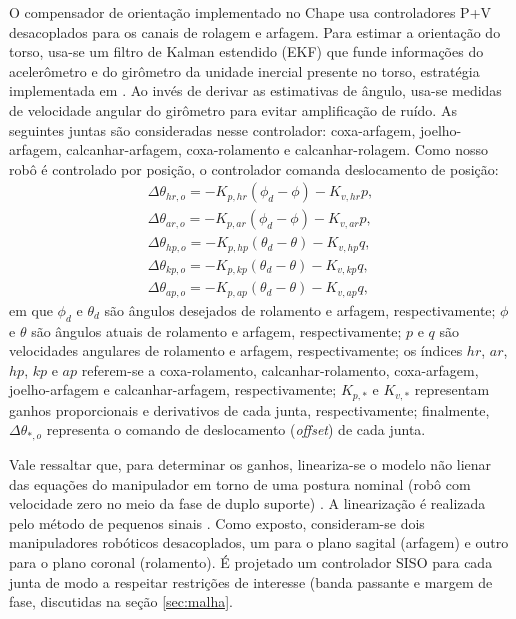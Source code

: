 O compensador de orientação implementado no Chape usa controladores P+V desacoplados para os canais de rolagem e arfagem. Para estimar a orientação do torso, usa-se um filtro de Kalman estendido (EKF) que funde informações do acelerômetro e do girômetro da unidade inercial presente no torso, estratégia implementada em \cite{tesemarcos}. Ao invés de derivar as estimativas de ângulo, usa-se medidas de velocidade angular do girômetro para evitar amplificação de ruído. As seguintes juntas são consideradas nesse controlador: coxa-arfagem, joelho-arfagem, calcanhar-arfagem, coxa-rolamento e calcanhar-rolagem. Como nosso robô é controlado por posição, o controlador comanda deslocamento de posição:
\begin{align}
\Delta \theta_{hr,o} = -K_{p,hr} \left( \phi_d - \phi \right) - K_{v,hr} p, \\
\Delta \theta_{ar,o} = -K_{p,ar} \left( \phi_d - \phi \right) - K_{v,ar} p, \\
\Delta \theta_{hp,o} = -K_{p,hp} \left( \theta_d - \theta \right) - K_{v,hp} q, \\
\Delta \theta_{kp,o} = -K_{p,kp} \left( \theta_d - \theta \right) - K_{v,kp} q, \\
\Delta \theta_{ap,o} = -K_{p,ap} \left( \theta_d - \theta \right) - K_{v,ap} q,
\end{align}
em que \( \phi_d \) e \( \theta_d \) são ângulos desejados de rolamento e arfagem, respectivamente; \( \phi \) e \( \theta \) são ângulos atuais de rolamento e arfagem, respectivamente; \( p \) e \( q \) são velocidades angulares de rolamento e arfagem, respectivamente; os índices \( hr \), \( ar \), \( hp \), \( kp \) e \( ap \) referem-se a coxa-rolamento, calcanhar-rolamento, coxa-arfagem, joelho-arfagem e calcanhar-arfagem, respectivamente; \( K_{p,*} \) e \( K_{v,*} \) representam ganhos proporcionais e derivativos de cada junta, respectivamente; finalmente, \( \Delta \theta_{*,o} \) representa o comando de deslocamento (\emph{offset}) de cada junta.

Vale ressaltar que, para determinar os ganhos, lineariza-se o modelo não lienar das equações do manipulador em torno de uma postura nominal (robô com velocidade zero no meio da fase de duplo suporte) \cite{tesemarcos}. A linearização é realizada pelo método de pequenos sinais \cite{franklin2013}. Como exposto, consideram-se dois manipuladores robóticos desacoplados, um para o plano sagital (arfagem) e outro para o plano coronal (rolamento). É projetado um controlador SISO para cada junta de modo a respeitar restrições de interesse (banda passante e margem de fase, discutidas na seção \ref{sec:malha}.

